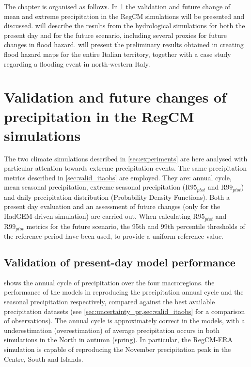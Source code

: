 The chapter is organised as follows.
In \cref{sec:results_regcm} the validation and future change of mean and extreme precipitation in the RegCM simulations will be presented and discussed.
 will describe the results from the hydrological simulations for both the present day and for the future scenario, including several proxies for future changes in flood hazard.
 will present the preliminary results obtained in creating flood hazard maps for the entire Italian territory, together with a case study regarding a flooding event in north-western Italy.

\section{Validation and future changes of precipitation in the RegCM simulations}\label{sec:results_regcm}
The two climate simulations described in \cref{sec:experiments} are here analysed with particular attention towards extreme precipitation events.
The same precipitation metrics described in \cref{sec:valid_itaobs} are employed.
They are: annual cycle, mean seasonal precipitation, extreme seasonal precipitation ($\textrm{R95}_{ptot}$ and $\textrm{R99}_{ptot}$) and daily precipitation distribution (Probability Density Functions).
Both a present day evaluation and an assessment of future changes (only for the HadGEM-driven simulation) are carried out.
When calculating $\textrm{R95}_{ptot}$ and $\textrm{R99}_{ptot}$ metrics for the future scenario, the 95th and 99th percentile thresholds of the reference period have been used, to provide a uniform reference value.

\subsection{Validation of present-day model performance}\label{sec:valid_regcm}
 shows the annual cycle of precipitation over the four macroregions. the performance of the models in reproducing the precipitation annual cycle and the seasonal precipitation respectively, compared against the best available precipitation datasets (see \cref{sec:uncertainty_pr,sec:valid_itaobs} for a comparison of observations).
The annual cycle is approximately correct in the models, with a underestimation (overestimation) of average precipitation occurs in both simulations in the North in autumn (spring).
In particular, the RegCM-ERA simulation is capable of reproducing the November precipitation peak in the Centre, South and Islands.

